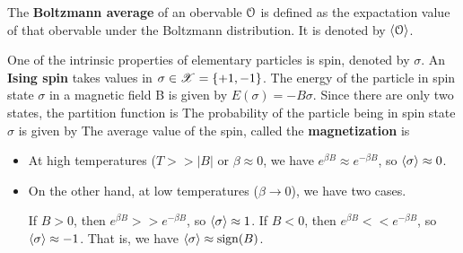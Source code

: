 \documentclass[letterpaper,english,10pt]{article}
\begin{document}
\begin{defn}
The \textbf{Boltzmann average} of an obervable $\mathcal{O}$ is defined as the expactation value of that obervable under the Boltzmann distribution. It is denoted by $\left\langle\mathcal{O}\right\rangle$.
\end{defn}
\begin{shaded*} 
\begin{exmp}
One of the intrinsic properties of elementary particles is spin, denoted by $\sigma$. An \textbf{Ising spin} takes values in $\sigma \in \mathscr{X} =\{+1, -1\}$. The energy of the particle in spin state $\sigma$ in a magnetic field B is given by $E(\sigma)=-B\sigma$. 
Since there are only two states, the partition function is 
The probability of the particle being in spin state $\sigma$ is given by 
The average value of the spin, called the \textbf{magnetization} is
\begin{itemize}
\item At high temperatures ($T>>|B|$ or $\beta \approx 0$, we have $e^{\beta B} \approx e^{-\beta B}$, so $\left\langle\sigma\right\rangle \approx 0$.  
\item On the other hand, at low temperatures ($\beta \to 0$), we have two cases. 

If $B>0$, then $e^{\beta B} >> e^{-\beta B}$, so $\left\langle\sigma\right\rangle \approx 1$. 
If $B<0$, then $e^{\beta B} << e^{-\beta B}$, so $\left\langle\sigma\right\rangle \approx -1$. 
That is, we have $\left\langle\sigma\right\rangle \approx \operatorname{sign}(B)$. 
\end{itemize}
\end{exmp} 
\end{shaded*}
\end{document}
